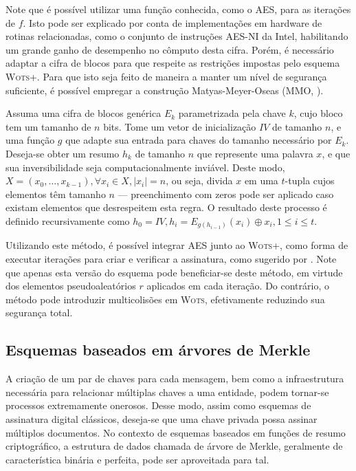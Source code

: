 \documentclass[12pt]{report}
\begin{document}
Note que é possível utilizar uma função conhecida, como o AES, para as iterações de $f$. Isto pode ser explicado por conta de implementações em hardware de rotinas relacionadas, como o conjunto de instruções AES-NI da Intel, habilitando um grande ganho de desempenho no cômputo desta cifra. Porém, é necessário adaptar a cifra de blocos para que respeite as restrições impostas pelo esquema \textsc{Wots+}. Para que isto seja feito de maneira a manter um nível de segurança suficiente, é possível empregar a construção Matyas-Meyer-Oseas (MMO, \cite[9.41]{Menezes:1996:HAC:548089}).

Assuma uma cifra de blocos genérica $E_{k}$ parametrizada pela chave $k$, cujo bloco tem um tamanho de $n$ bits. Tome um vetor de inicialização $IV$ de tamanho $n$, e uma função $g$ que adapte sua entrada para chaves do tamanho necessário por $E_{k}$. Deseja-se obter um resumo $h_k$ de tamanho $n$ que represente uma palavra $x$, e que sua inversibilidade seja computacionalmente inviável. Deste modo, $X = (x_0, \dots, x_{k - 1}), \forall x_i \in X, \vert x_i \vert = n$, ou seja, divida $x$ em uma $t$-tupla cujos elementos têm tamanho $n$ --- preenchimento com zeros pode ser aplicado caso existam elementos que desrespeitem esta regra. O resultado deste processo é definido recursivamente como $h_0 = IV, h_i = E_{g(h_{i-1})}(x_i) \oplus x_i, 1 \leq i \leq t$.

Utilizando este método, é possível integrar AES junto ao \textsc{Wots+}, como forma de executar iterações para criar e verificar a assinatura, como sugerido por \cite[4.1]{cryptoeprint:2017:965}. Note que apenas esta versão do esquema pode beneficiar-se deste método, em virtude dos elementos pseudoaleatórios $r$ aplicados em cada iteração. Do contrário, o método pode introduzir multicolisões em \textsc{Wots}, efetivamente reduzindo sua segurança total. %

\subsection{Esquemas baseados em árvores de Merkle}

A criação de um par de chaves para cada mensagem, bem como a infraestrutura necessária para relacionar múltiplas chaves a uma entidade, podem tornar-se processos extremamente onerosos. Desse modo, assim como esquemas de assinatura digital clássicos, deseja-se que uma chave privada possa assinar múltiplos documentos. No contexto de esquemas baseados em funções de resumo criptográfico, a estrutura de dados chamada de árvore de Merkle, geralmente de característica binária e perfeita, pode ser aproveitada para tal.
\end{document}
